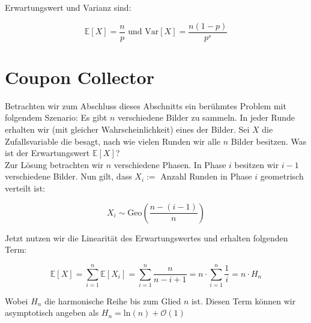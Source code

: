 Erwartungswert und Varianz sind:

$$\mathbb{E}[X] = \frac{n}{p} \text{ und Var}[X] = \frac{n(1-p)}{p^s} $$

\section{Coupon Collector}

Betrachten wir zum Abschluss dieses Abschnitts ein berühmtes Problem mit folgendem Szenario: Es gibt 
$n$ verschiedene Bilder zu sammeln. In jeder Runde erhalten wir (mit gleicher Wahrscheinlichkeit) eines 
der Bilder. Sei $X$ die Zufallsvariable die besagt, nach wie vielen Runden wir alle $n$ Bilder besitzen. 
Was ist der Erwartungswert $\mathbb{E}[X]$? \\

Zur Lösung betrachten wir $n$ verschiedene Phasen. In Phase $i$ besitzen wir $i - 1$ verschiedene Bilder. 
Nun gilt, dass $X_i := $ Anzahl Runden in Phase $i$ geometrisch verteilt ist:

$$X_i \sim \text{Geo}(\frac{n-(i-1)}{n})$$

Jetzt nutzen wir die Linearität des Erwartungswertes und erhalten folgenden Term:

$$\mathbb{E}[X] = \sum_{i = 1}^n \mathbb{E}[X_i] = \sum_{i = 1}^n \frac{n}{n - i + 1} = n \cdot \sum_{i = 1}^n \frac{1}{i} = n \cdot H_n$$

Wobei $H_n$ die harmonische Reihe bis zum Glied $n$ ist. Diesen Term können wir asymptotisch angeben
als $H_n = \text{ln}(n) + \mathcal{O}(1)$